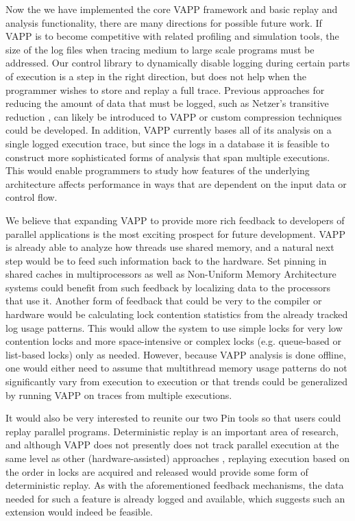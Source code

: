Now the we have implemented the core VAPP framework and basic
replay and analysis functionality, there are many directions
for possible future work.  If VAPP is to become competitive
with related profiling and simulation tools, the size of the
log files when tracing medium to large scale programs must be
addressed.  Our control library to dynamically disable logging
during certain parts of execution is a step in the right direction,
but does not help when the programmer wishes to store and replay
a full trace.  Previous approaches for reducing the amount
of data that must be logged, such as Netzer's transitive
reduction \cite{netzer1993optimal}, can likely be introduced to
VAPP or custom compression techniques could be developed.  In addition,
VAPP currently bases all of its analysis on a single logged
execution trace, but since the logs in a database it is feasible
to construct more sophisticated forms of analysis that span multiple
executions.  This would enable programmers to study how features
of the underlying architecture affects performance in ways that
are dependent on the input data or control flow.

We believe that expanding VAPP to provide more rich feedback to
developers of parallel applications is the most exciting prospect
for future development.  VAPP is already able to analyze how
threads use shared memory, and a natural next step would be to
feed such information back to the hardware.  Set pinning in
shared caches in multiprocessors as well as Non-Uniform Memory Architecture
systems could benefit from such feedback by localizing data
to the processors that use it.  Another form of feedback
that could be very to the compiler or hardware would be calculating
lock contention statistics from the already tracked log usage patterns.
This would allow the system to use simple locks for very low contention
locks and more space-intensive or complex locks (e.g. queue-based 
or list-based locks) only as needed.  However, because VAPP analysis
is done offline, one would either need to assume that multithread
memory usage patterns do not significantly vary from execution to
execution or that trends could be generalized by running VAPP on
traces from multiple executions.  

It would also be very interested to reunite our two Pin tools
so that users could replay parallel programs.  Deterministic
replay is an important area of research, and although VAPP does not
presently does not track parallel execution at the same level as
other (hardware-assisted) approaches \cite{narayansamy2005bugnet},
replaying execution based on the order in locks are acquired and
released would provide some form of deterministic replay.  As with
the aforementioned feedback mechanisms, the data needed for such a
feature is already logged and available, which suggests such an
extension would indeed be feasible.
